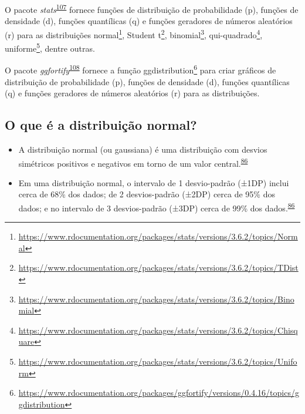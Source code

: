 \documentclass[
  a4paper,
]{book}
\renewcommand{\href}[2]{#2\footnote{\url{#1}}}
\newenvironment{infobox}[1]
  {
  \begin{itemize}
  \renewcommand{\labelitemi}{
    \raisebox{-.7\height}[0pt][0pt]{
      {\setkeys{Gin}{width=3em,keepaspectratio}
        \texttt{[image: \#1]}}
    }
  }
  \setlength{\fboxsep}{1em}
  \begin{blackbox}
  \item
  }
  {
  \end{blackbox}
  \end{itemize}
  }
\begin{document}
\begin{infobox}{images/Rlogo}
O pacote \emph{stats}\textsuperscript{\protect\hyperlink{ref-stats-3}{107}} fornece funções de distribuição de probabilidade (p), funções de densidade (d), funções quantílicas (q) e funções geradores de números aleatórios (r) para as distribuições \href{https://www.rdocumentation.org/packages/stats/versions/3.6.2/topics/Normal}{normal}, \href{https://www.rdocumentation.org/packages/stats/versions/3.6.2/topics/TDist}{Student t}, \href{https://www.rdocumentation.org/packages/stats/versions/3.6.2/topics/Binomial}{binomial}, \href{https://www.rdocumentation.org/packages/stats/versions/3.6.2/topics/Chisquare}{qui-quadrado}, \href{https://www.rdocumentation.org/packages/stats/versions/3.6.2/topics/Uniform}{uniforme}, dentre outras.

\end{infobox}

\begin{infobox}{images/Rlogo}
O pacote \emph{ggfortify}\textsuperscript{\protect\hyperlink{ref-ggfortify}{108}} fornece a função \href{https://www.rdocumentation.org/packages/ggfortify/versions/0.4.16/topics/ggdistribution}{ggdistribution} para criar gráficos de distribuição de probabilidade (p), funções de densidade (d), funções quantílicas (q) e funções geradores de números aleatórios (r) para as distribuições.

\end{infobox}

\hypertarget{o-que-uxe9-a-distribuiuxe7uxe3o-normal}{%
\subsection{O que é a distribuição normal?}\label{o-que-uxe9-a-distribuiuxe7uxe3o-normal}}

\begin{itemize}
\item
  A distribuição normal (ou gaussiana) é uma distribuição com desvios simétricos positivos e negativos em torno de um valor central.\textsuperscript{\protect\hyperlink{ref-Ali2016}{86}}
\item
  Em uma distribuição normal, o intervalo de 1 desvio-padrão (±1DP) inclui cerca de 68\% dos dados; de 2 desvios-padrão (±2DP) cerca de 95\% dos dados; e no intervalo de 3 desvios-padrão (±3DP) cerca de 99\% dos dados.\textsuperscript{\protect\hyperlink{ref-Ali2016}{86}}
\end{itemize}
\end{document}
